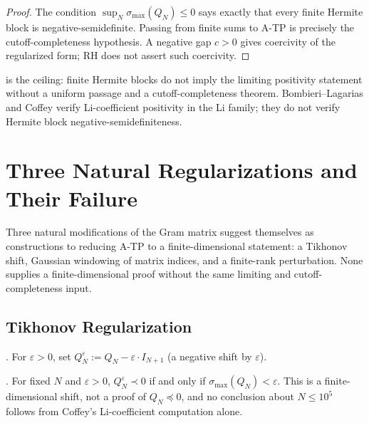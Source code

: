 \begin{proof}
The condition \(\sup_N\sigma_{\max}(Q_N)\leq0\) says exactly that
every finite Hermite block is negative-semidefinite. Passing from
finite sums to A-TP is precisely the cutoff-completeness hypothesis.
A negative gap \(c>0\) gives coercivity of the regularized form; RH
does not assert such coercivity.
\end{proof}

\begin{remark}
\label{v4-arith:w7-h:rem:uniform-ceiling}
 is the ceiling: finite Hermite blocks
do not imply the limiting positivity statement without a uniform
passage and a cutoff-completeness theorem. Bombieri--Lagarias and
Coffey verify Li-coefficient positivity in the Li family; they do not
verify Hermite block negative-semidefiniteness.
\end{remark}

\section{Three Natural Regularizations and Their Failure}
\label{v4-arith:w7-h:regularizations}

Three natural modifications of the Gram matrix suggest themselves as
constructions to reducing A-TP to a finite-dimensional statement: a Tikhonov
shift, Gaussian windowing of matrix indices, and a finite-rank
perturbation. None supplies a finite-dimensional proof without the
same limiting and cutoff-completeness input.

\subsection{Tikhonov Regularization}
\label{v4-arith:w7-h:regularizations:tikhonov}

\begin{definition}
\label{v4-arith:w7-h:def:tikhonov}
\ClaimStatusDefinitional. For \(\varepsilon>0\), set
\(Q_{N}^{\varepsilon}:=Q_{N}-\varepsilon\cdot I_{N+1}\)
(a negative shift by \(\varepsilon\)).
\end{definition}

\begin{proposition}
\label{v4-arith:w7-h:prop:tikhonov-pos}
\ClaimStatusProvedHere. For fixed \(N\) and \(\varepsilon>0\),
\(Q_{N}^{\varepsilon}\prec0\) if and only if
\(\sigma_{\max}(Q_{N})<\varepsilon\). This is a finite-dimensional
shift, not a proof of \(Q_{N}\preceq0\), and no conclusion about
\(N\leq10^{5}\) follows from Coffey's Li-coefficient computation alone.
\end{proposition}

